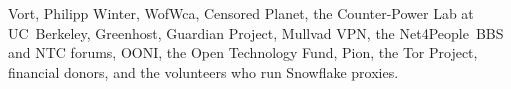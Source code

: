 \documentclass[letterpaper,twocolumn]{article}
\begin{document}
Vort, %
Philipp Winter, %
WofWca, %
Censored Planet, %
the Counter-Power Lab at UC~Berkeley,
Greenhost, %
Guardian Project, %
Mullvad VPN, %
the Net4People~BBS and NTC forums, %
OONI, %
the Open Technology Fund, %
Pion,
the Tor Project,
financial donors,
and the volunteers who run Snowflake proxies.

{
\raggedright


}
\end{document}
